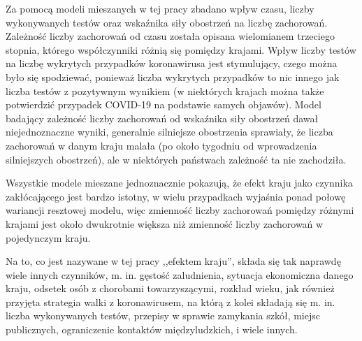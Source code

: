 \documentclass[12pt]{mwbk}
\theoremstyle{plain}
\theoremstyle{definition}
\theoremstyle{remark}
\begin{document}
Za pomocą modeli mieszanych w tej pracy zbadano wpływ czasu, liczby wykonywanych testów oraz wskaźnika siły obostrzeń na liczbę zachorowań. Zależność liczby zachorowań od czasu została opisana wielomianem trzeciego stopnia, którego współczynniki różnią się pomiędzy krajami. Wpływ liczby testów na liczbę wykrytych przypadków koronawirusa jest stymulujący, czego można było się spodziewać, ponieważ liczba wykrytych przypadków to nic innego jak liczba testów z pozytywnym wynikiem (w niektórych krajach można także potwierdzić przypadek COVID-19 na podstawie samych objawów). Model badający zależność liczby zachorowań od wskaźnika siły obostrzeń dawał niejednoznaczne wyniki, generalnie silniejsze obostrzenia sprawiały, że liczba zachorowań w danym kraju malała (po około tygodniu od wprowadzenia silniejszych obostrzeń), ale w niektórych państwach zależność ta nie zachodziła.

Wszystkie modele mieszane jednoznacznie pokazują, że efekt kraju jako czynnika zakłócającego jest bardzo istotny, w wielu przypadkach wyjaśnia ponad połowę wariancji resztowej modelu, więc zmienność liczby zachorowań pomiędzy różnymi krajami jest około dwukrotnie większa niż zmienność liczby zachorowań w pojedynczym kraju.

Na to, co jest nazywane w tej pracy ,,efektem kraju'', składa się tak naprawdę wiele innych czynników, m. in. gęstość zaludnienia, sytuacja ekonomiczna danego kraju, odsetek osób z chorobami towarzyszącymi, rozkład wieku, jak również przyjęta strategia walki z koronawirusem, na którą z kolei składają się m. in. liczba wykonywanych testów, przepisy w sprawie zamykania szkół, miejsc publicznych, ograniczenie kontaktów międzyludzkich, i wiele innych.
\end{document}

